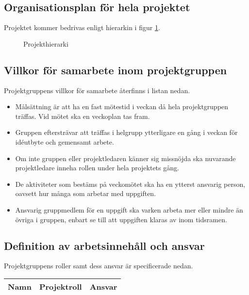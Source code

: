 \documentclass[11pt]{article}
\begin{document}
\begin{flushleft}
\pagebreak
\section{Organisationsplan för hela projektet}
Projektet kommer bedrivas enligt hierarkin i figur \ref{hierarki}.

\begin{figure}[htbp]
\centering
\noindent\resizebox{.5\linewidth}{!}{
	}
	\caption{Projekthierarki} \label{hierarki}	
\end{figure}

\subsection{Villkor för samarbete inom projektgruppen}
Projektgruppens villkor för samarbete återfinns i listan nedan.
\begin{itemize}
	\item Målsättning är att ha en fast mötestid i veckan då hela projektgruppen träffas. Vid mötet ska en veckoplan tas fram.
	\item Gruppen eftersträvar att träffas i helgrupp ytterligare en gång i veckan för idéutbyte och gemensamt arbete.
	\item Om inte gruppen eller projektledaren känner sig missnöjda ska nuvarande projektledare inneha rollen under hela projektets gång.
	\item De aktiviteter som bestäms på veckomötet ska ha en ytterst ansvarig person, oavsett hur många som arbetar med uppgiften.
	\item Ansvarig gruppmedlem för en uppgift ska varken arbeta mer eller mindre än övriga i gruppen, enbart se till att uppgiften klaras av inom tidsramen.
\end{itemize}

\subsection{Definition av arbetsinnehåll och ansvar}
Projektgruppens roller samt dess ansvar är specificerade nedan.
\begin{longtable}{| p{.2\linewidth} | p{.2\linewidth} | p{.5\linewidth} |} \hline
\textbf{Namn} & \textbf{Projektroll} & \textbf{Ansvar} \\ \hline \endhead


\end{longtable}
\end{flushleft}
\end{document}
